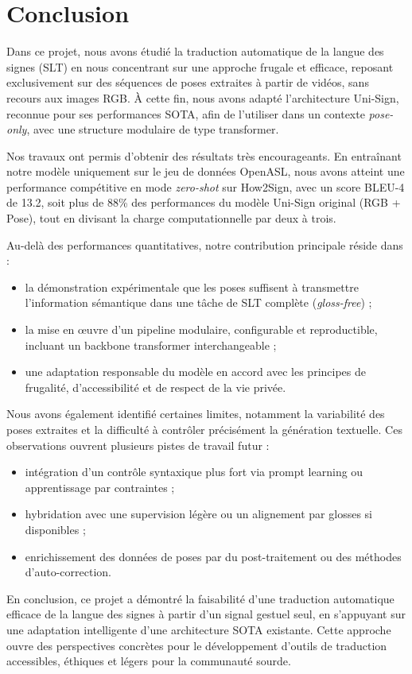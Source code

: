 \section{Conclusion}

Dans ce projet, nous avons étudié la traduction automatique de la langue des signes (SLT) en nous concentrant sur une approche frugale et efficace, reposant exclusivement sur des séquences de poses extraites à partir de vidéos, sans recours aux images RGB. À cette fin, nous avons adapté l’architecture Uni-Sign, reconnue pour ses performances SOTA, afin de l’utiliser dans un contexte \textit{pose-only}, avec une structure modulaire de type transformer.

Nos travaux ont permis d’obtenir des résultats très encourageants. En entraînant notre modèle uniquement sur le jeu de données OpenASL, nous avons atteint une performance compétitive en mode \textit{zero-shot} sur How2Sign, avec un score BLEU-4 de 13.2, soit plus de 88\% des performances du modèle Uni-Sign original (RGB + Pose), tout en divisant la charge computationnelle par deux à trois.

Au-delà des performances quantitatives, notre contribution principale réside dans :
\begin{itemize}
    \item la démonstration expérimentale que les poses suffisent à transmettre l’information sémantique dans une tâche de SLT complète (\textit{gloss-free}) ;
    \item la mise en œuvre d’un pipeline modulaire, configurable et reproductible, incluant un backbone transformer interchangeable ;
    \item une adaptation responsable du modèle en accord avec les principes de frugalité, d’accessibilité et de respect de la vie privée.
\end{itemize}

Nous avons également identifié certaines limites, notamment la variabilité des poses extraites et la difficulté à contrôler précisément la génération textuelle. Ces observations ouvrent plusieurs pistes de travail futur :
\begin{itemize}
    \item intégration d’un contrôle syntaxique plus fort via prompt learning ou apprentissage par contraintes ;
    \item hybridation avec une supervision légère ou un alignement par glosses si disponibles ;
    \item enrichissement des données de poses par du post-traitement ou des méthodes d’auto-correction.
\end{itemize}

En conclusion, ce projet a démontré la faisabilité d’une traduction automatique efficace de la langue des signes à partir d’un signal gestuel seul, en s’appuyant sur une adaptation intelligente d’une architecture SOTA existante. Cette approche ouvre des perspectives concrètes pour le développement d’outils de traduction accessibles, éthiques et légers pour la communauté sourde.
